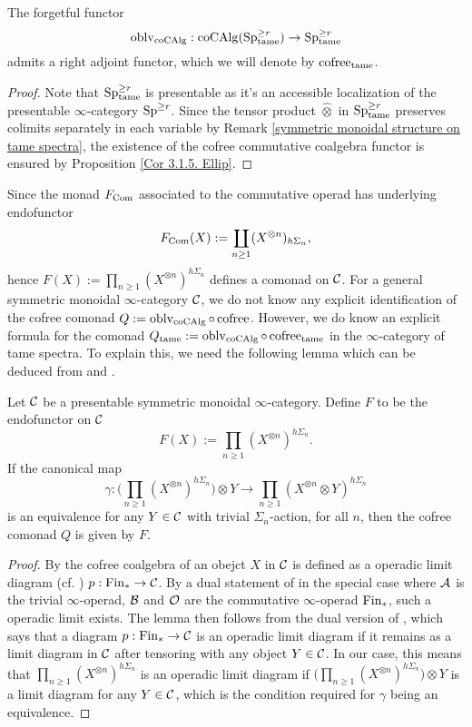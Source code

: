\begin{corollary}
The forgetful functor 
$$
\operatorname{oblv}_{\operatorname{coCAlg}}:\operatorname{coCAlg}(\operatorname{Sp}_{\operatorname{\operatorname{tame}}}^{\geq r})\to \operatorname{Sp}^{\geq r}_{\operatorname{\operatorname{tame}}}
$$ admits a right adjoint functor, which we will denote by $\operatorname{cofree}_{\operatorname{\operatorname{tame}}}$.
\end{corollary}
\begin{proof}
	 Note that $\operatorname{Sp}^{\geq r}_{\operatorname{\operatorname{tame}}}$ is presentable as it's an accessible localization of the presentable $\infty$-category $\operatorname{Sp}^{\geq r}$. 
	 Since the tensor product $\hat{\otimes}$ in $\operatorname{Sp}_{\operatorname{\operatorname{tame}}}^{\geq r}$ preserves colimits separately in each variable by Remark \ref{symmetric monoidal structure on tame spectra}, the existence of the cofree commutative coalgebra functor is ensured by Proposition \ref{Cor 3.1.5. Ellip}.
\end{proof}

Since the monad $F_{\operatorname{Com}}$ associated to the commutative operad has underlying endofunctor
$$
F_{\operatorname{Com}}(X) := \coprod_{n\geq 1} (X^{\otimes n})_{h\Sigma_n},
$$ hence $F(X):= \prod_{n\geq 1} (X^{\otimes n})^{h\Sigma_n}$ defines a comonad on ${\mathcal{C}}$.
For a general symmetric monoidal $\infty$-category ${\mathcal{C}}$, we do not know any explicit identification of the cofree comonad $Q:=\operatorname{oblv}_{\operatorname{coCAlg}}\circ \operatorname{cofree}$. 
However, we do know an explicit formula for the comonad $Q_{\operatorname{\operatorname{tame}}}:=\operatorname{oblv}_{\operatorname{coCAlg}}\circ \operatorname{cofree}_{\operatorname{\operatorname{tame}}}$ in the $\infty$-category of tame spectra. 
To explain this, we need the following lemma which can be deduced from \cite[Proposition 3.1.3.3]{HA} and \cite[Example 3.1.1.17]{HA}.
\begin{lemma}
\label{Cofree commutative coalgebra}
Let ${\mathcal{C}}$ be a presentable symmetric monoidal $\infty$-category.
Define $F$ to be the endofunctor on ${\mathcal{C}}$
$$
F(X):= \prod_{n\geq 1} (X^{\otimes n})^{h\Sigma_n}.
$$
If the canonical map 
$$
\gamma: \big( \prod_{n\geq 1} (X^{\otimes n})^{h\Sigma_n} \big) \otimes Y \to 
\prod_{n\geq 1} (X^{\otimes n} \otimes Y)^{h\Sigma_n}
$$
is an equivalence for any $Y\in {\mathcal{C}}$ with trivial $\Sigma_n$-action, for all $n$,
then the cofree comonad $Q$ is given by $F$.
\end{lemma}
\begin{proof}
    By \cite[Definition 3.1.3.1.]{HA} the cofree coalgebra of an obejct $X$ in ${\mathcal{C}}$ is defined as a operadic limit diagram (cf. \cite[Definition 3.1.1.2.]{HA}) $p:\operatorname{Fin}_{*} \to {\mathcal{C}}$.
    By a dual statement of \cite[Proposition 3.1.3.3]{HA} in the special case where ${\mathcal{A}}$ is the trivial $\infty$-operad, ${\mathcal{B}}$ and ${\mathcal{O}}$ are the commutative $\infty$-operad $\operatorname{Fin}_{*}$, such a operadic limit exists.
    The lemma then follows from the dual version of \cite[Example 3.1.1.17]{HA}, which says that a diagram $p:\operatorname{Fin}_{*} \to {\mathcal{C}}$ is an operadic limit diagram if it remains as a limit diagram in ${\mathcal{C}}$ after tensoring with any object $Y\in{\mathcal{C}}$. 
    In our case, this means that $\prod_{n\geq 1} (X^{\otimes n})^{h\Sigma_n}$ is an operadic limit diagram if 
    $\big( \prod_{n\geq 1} (X^{\otimes n})^{h\Sigma_n} \big) \otimes Y$ is a limit diagram for any $Y\in {\mathcal{C}}$, which is the condition required for $\gamma$ being an equivalence.
    
\end{proof}

